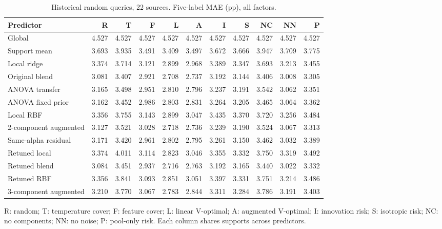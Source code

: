 \documentclass[11pt]{article}
\begin{document}
\clearpage\begin{landscape}\begin{table}[htbp]\centering\small
\caption{Historical random queries, 22 sources. Five-label MAE (pp), all factors.}
\begin{tabular}{lrrrrrrrrrr}\toprule Predictor & R & T & F & L & A & I & S & NC & NN & P\\\midrule
Global & 4.527 & 4.527 & 4.527 & 4.527 & 4.527 & 4.527 & 4.527 & 4.527 & 4.527 & 4.527\\
Support mean & 3.693 & 3.935 & 3.491 & 3.409 & 3.497 & 3.672 & 3.666 & 3.947 & 3.709 & 3.775\\
Local ridge & 3.374 & 3.714 & 3.121 & 2.899 & 2.968 & 3.389 & 3.347 & 3.693 & 3.213 & 3.455\\
Original blend & 3.081 & 3.407 & 2.921 & 2.708 & 2.737 & 3.192 & 3.144 & 3.406 & 3.008 & 3.305\\
ANOVA transfer & 3.165 & 3.498 & 2.951 & 2.810 & 2.796 & 3.237 & 3.191 & 3.542 & 3.062 & 3.351\\
ANOVA fixed prior & 3.162 & 3.452 & 2.986 & 2.803 & 2.831 & 3.264 & 3.205 & 3.465 & 3.064 & 3.362\\
Local RBF & 3.356 & 3.755 & 3.143 & 2.899 & 3.047 & 3.435 & 3.370 & 3.720 & 3.256 & 3.484\\
2-component augmented & 3.127 & 3.521 & 3.028 & 2.718 & 2.736 & 3.239 & 3.190 & 3.524 & 3.067 & 3.313\\
Same-alpha residual & 3.171 & 3.420 & 2.961 & 2.802 & 2.795 & 3.261 & 3.150 & 3.462 & 3.032 & 3.389\\
Retuned local & 3.374 & 4.011 & 3.114 & 2.823 & 3.046 & 3.355 & 3.332 & 3.750 & 3.319 & 3.492\\
Retuned blend & 3.084 & 3.451 & 2.937 & 2.716 & 2.763 & 3.192 & 3.165 & 3.440 & 3.022 & 3.332\\
Retuned RBF & 3.356 & 3.841 & 3.093 & 2.851 & 3.051 & 3.397 & 3.331 & 3.751 & 3.214 & 3.486\\
3-component augmented & 3.210 & 3.770 & 3.067 & 2.783 & 2.844 & 3.311 & 3.284 & 3.786 & 3.191 & 3.403\\
\bottomrule\end{tabular}\par\medskip\footnotesize R: random; T: temperature cover; F: feature cover; L: linear V-optimal; A: augmented V-optimal; I: innovation risk; S: isotropic risk; NC: no components; NN: no noise; P: pool-only risk. Each column shares supports across predictors.\end{table}\end{landscape}
\end{document}
